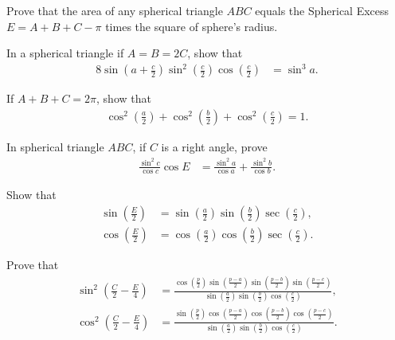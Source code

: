 \begin{tcolorbox}[title={Exercises on Spherical Excess $E$}]
\begin{question}
    Prove that the area of any spherical triangle $ABC$ equals the Spherical Excess $E=A+B+C-\pi$ times the square of sphere's radius.
\end{question}

\begin{question}%
    In a spherical triangle if $A=B=2C$, show that
    \begin{align*}
        8\sin\left(a+\frac{c}{2}\right)\sin^2\left(\frac{c}{2}\right)\cos\left(\frac{c}{2}\right) &= \sin^3 a.
    \end{align*}
\end{question}

\begin{question}%
    If $A+B+C=2\pi$, show that
    \begin{align*}
        \cos^2\left(\frac{a}{2}\right)+\cos^2\left(\frac{b}{2}\right)+\cos^2\left(\frac{c}{2}\right)=1.
    \end{align*}
\end{question}

\begin{question}
    In spherical triangle $ABC$, if $C$ is a right angle, prove
    \begin{align*}
        \frac{\sin^2 c}{\cos c} \cos E &= \frac{\sin^2 a}{\cos a}+\frac{\sin^2 b}{\cos b}.
    \end{align*}
\end{question}

\begin{question}
    Show that
    \begin{align*}
        \sin\left(\frac{E}{2}\right) &= \sin\left(\frac{a}{2}\right)\sin\left(\frac{b}{2}\right) \sec\left(\frac{c}{2}\right),\\
        \cos\left(\frac{E}{2}\right) &= \cos\left(\frac{a}{2}\right)\cos\left(\frac{b}{2}\right) \sec\left(\frac{c}{2}\right).
    \end{align*}
\end{question}


\begin{question}
    Prove that
    \begin{align*}
        \sin^2\left(\frac{C}{2}-\frac{E}{4}\right) &= \frac{\displaystyle \cos\left(\frac{p}{2}\right)\sin\left(\frac{p-a}{2}\right)\sin\left(\frac{p-b}{2}\right)\sin\left(\frac{p-c}{2}\right)}{\displaystyle \sin\left(\frac{a}{2}\right)\sin\left(\frac{b}{2}\right)\cos\left(\frac{c}{2}\right)},\\
        \cos^2\left(\frac{C}{2}-\frac{E}{4}\right) &= \frac{\displaystyle \sin\left(\frac{p}{2}\right)\cos\left(\frac{p-a}{2}\right)\cos\left(\frac{p-b}{2}\right)\cos\left(\frac{p-c}{2}\right)}{\displaystyle \sin\left(\frac{a}{2}\right)\sin\left(\frac{b}{2}\right)\cos\left(\frac{c}{2}\right)}.
    \end{align*}
\end{question}



\end{tcolorbox}
